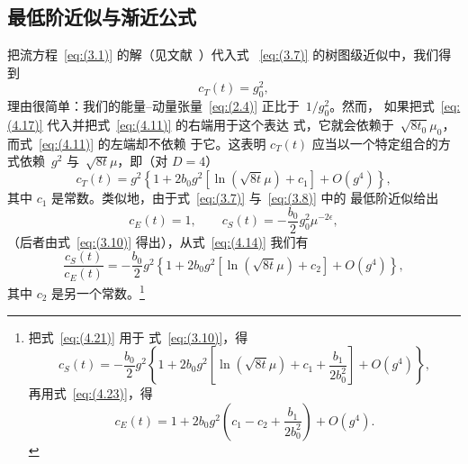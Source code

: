 \subsection{最低阶近似与渐近公式}
把流方程~\eqref{eq:(3.1)} 的解（见文献~\cite{Luscher:2011bx}）代入式%
~\eqref{eq:(3.7)} 的树图级近似中，我们得到
\begin{equation}
   c_T(t)=g_0^2,
\label{eq:(4.20)}
\end{equation}
理由很简单：我们的能量--动量张量~\eqref{eq:(2.4)} 正比于~$1/g_0^2$。然而，
如果把式~\eqref{eq:(4.17)} 代入并把式~\eqref{eq:(4.11)} 的右端用于这个表达
式，它就会依赖于~$\sqrt{8t_0}\mu_0$，而式~\eqref{eq:(4.11)} 的左端却不依赖
于它。这表明 $c_T(t)$ 应当以一个特定组合的方式依赖~$g^2$
 与~$\sqrt{8t}\mu$，即（对 $D=4$）
\begin{equation}
   c_T(t)=
   g^2\left\{1+2b_0g^2\left[\ln(\sqrt{8t}\mu)+c_1\right]+O(g^4)\right\},
\label{eq:(4.21)}
\end{equation}
其中 $c_1$ 是常数。类似地，由于式~\eqref{eq:(3.7)} 与~\eqref{eq:(3.8)} 中的
最低阶近似给出
\begin{equation}
   c_E(t)=1,\qquad
   c_S(t)=-\frac{b_0}{2}g_0^2\mu^{-2\epsilon},
\label{eq:(4.22)}
\end{equation}
（后者由式~\eqref{eq:(3.10)} 得出），从式~\eqref{eq:(4.14)} 我们有
\begin{equation}
   \frac{c_S(t)}{c_E(t)}
   =-\frac{b_0}{2}
   g^2\left\{1+2b_0g^2\left[\ln(\sqrt{8t}\mu)+c_2\right]+O(g^4)\right\},
\label{eq:(4.23)}
\end{equation}
其中 $c_2$ 是另一个常数。\footnote{把式~\eqref{eq:(4.21)} 用于
式~\eqref{eq:(3.10)}，得
\begin{equation}
   c_S(t)=-\frac{b_0}{2}
   g^2\left\{
   1+2b_0g^2
   \left[
   \ln(\sqrt{8t}\mu)+c_1+\frac{b_1}{2b_0^2}\right]+O(g^4)
   \right\},
\label{eq:(4.24)}
\end{equation}
再用式~\eqref{eq:(4.23)}，得
\begin{equation}
   c_E(t)=1+2b_0g^2
   \left(c_1-c_2+\frac{b_1}{2b_0^2}\right)+O(g^4).
\label{eq:(4.25)}
\end{equation}
}

